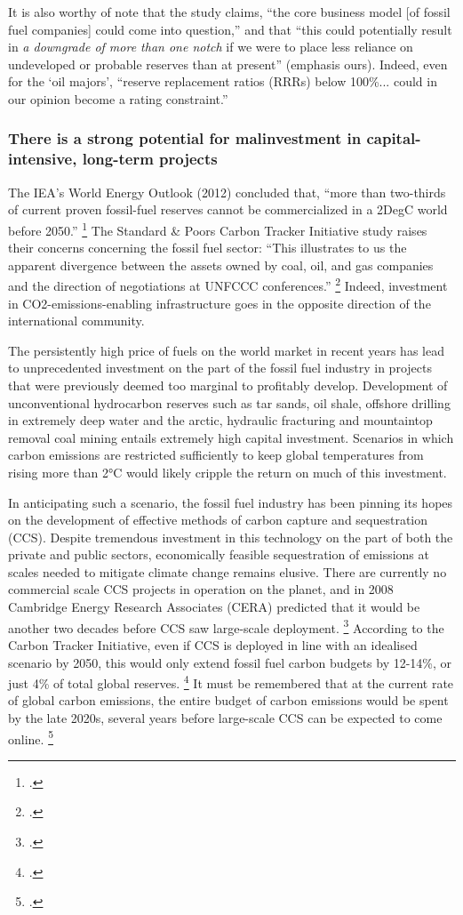   It is also worthy of note that the study claims, ``the core business model [of fossil fuel companies] could come into question,'' and that ``this could potentially result in \emph{a downgrade of more than one notch} if we were to place less reliance on undeveloped or probable reserves than at present'' (emphasis ours).
  Indeed, even for the `oil majors', ``reserve replacement ratios (RRRs) below 100\%... could in our opinion become a rating constraint.''
  
  


\subsubsection {There is a strong potential for malinvestment in capital-intensive, long-term projects}

The IEA's World Energy Outlook (2012) concluded that, ``more than two-thirds of current proven fossil-fuel reserves cannot be commercialized in a 2DegC world before 2050.'' \footcite{IEA2012}
The Standard \& Poors Carbon Tracker Initiative study raises their concerns concerning the fossil fuel sector: ``This illustrates to us the apparent divergence between the assets owned by coal, oil, and gas companies and the direction of negotiations at UNFCCC conferences.'' \footcite{SandPConstrained}
Indeed, investment in CO2-emissions-enabling infrastructure goes in the opposite direction of the international community.

The persistently high price of fuels on the world market in recent years has lead to unprecedented investment on the part of the fossil fuel industry in projects that were previously deemed too marginal to profitably develop. 
Development of unconventional hydrocarbon reserves such as tar sands, oil shale, offshore drilling in extremely deep water and the arctic, hydraulic fracturing and mountaintop removal coal mining entails extremely high capital investment. 
Scenarios in which carbon emissions are restricted sufficiently to keep global temperatures from rising more than 2°C would likely cripple the return on much of this investment.

In anticipating such a scenario, the fossil fuel industry has been pinning its hopes on the development of effective methods of carbon capture and sequestration (CCS). 
Despite tremendous investment in this technology on the part of both the private and public sectors, economically feasible sequestration of emissions at scales needed to mitigate climate change remains elusive. 
There are currently no commercial scale CCS projects in operation on the planet, and in 2008 Cambridge Energy Research Associates (CERA) predicted that it would be another two decades before CCS saw large-scale deployment. \footcite{CERACrossing}
According to the Carbon Tracker Initiative, even if CCS is deployed in line with an idealised scenario by 2050, this would only extend fossil fuel carbon budgets by 12-14\%, or just 4\% of total global reserves. \footcite{CTI2013}
It must be remembered that at the current rate of global carbon emissions, the entire budget of carbon emissions would be spent by the late 2020s, several years before large-scale CCS can be expected to come online. \footcite{CTI2012}

